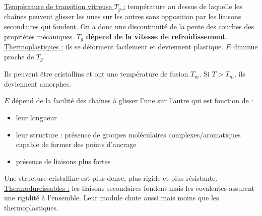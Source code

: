 \documentclass[../main.tex]{subfiles}
\begin{document}
\quad \underline{Température de transition vitreuse $T_g$ :} température au dessus de laquelle les chaînes peuvent glisser les unes sur les autres sans opposition par les liaisons secondaires qui fondent. On a donc une discontinuité de la pente des courbes des propriétés mécaniques. \textbf{$T_g$ dépend de la vitesse de refroidissement}.\\

\quad \underline{Thermoplastiques :} ils se déforment facilement et deviennent plastique. $E$ diminue proche de $T_g$. \\
\begin{minipage}{.5\textwidth}
Ils peuvent être cristallins et ont une température de fusion $T_m$. Si $T>T_m$, ils deviennent amorphes.\\
\end{minipage}
\vline
\begin{minipage}{.5\textwidth}
$E$ dépend de la facilité des chaînes à glisser l'une sur l'autre qui est fonction de :\\
\begin{itemize}
    \item leur longueur\\
    \item leur structure : présence de groupes moléculaires complexes/aromatiques capable de former des points d'ancrage\\
    \item présence de liaisons plus fortes\\
\end{itemize}
\end{minipage}

\warning Une structure cristalline est plus dense, plus rigide et plus résistante.\\

\quad \underline{Thermodurcissables :} les liaisons secondaires fondent mais les covalentes assurent une rigidité à l'ensemble. Leur module chute aussi mais moins que les thermoplastiques.\\
\end{document}
